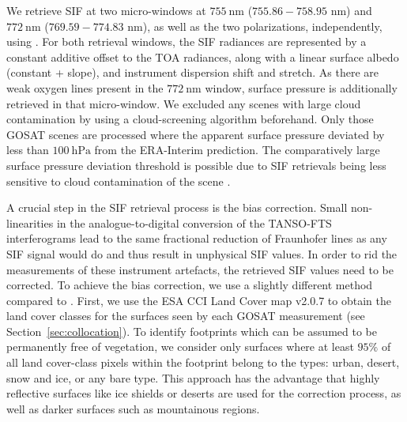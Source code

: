 \documentclass[preprint, a4paper, 10pt, times]{elsarticle}
\begin{document}
We retrieve SIF at two micro-windows at $755\:\mathrm{nm}$ ($755.86 - 758.95$ nm) and $772\:\mathrm{nm}$ ($769.59 - 774.83$ nm), as well as the two polarizations, independently, using \citet{Frankenberg2011}. For both retrieval windows, the SIF radiances are represented by a constant additive offset to the TOA radiances, along with a linear surface albedo (constant + slope), and instrument dispersion shift and stretch. As there are weak oxygen lines present in the $772\:\mathrm{nm}$ window, surface pressure is additionally retrieved in that micro-window. We excluded any scenes with large cloud contamination by using a cloud-screening algorithm beforehand. Only those GOSAT scenes are processed where the apparent surface pressure deviated by less than $100\:\mathrm{hPa}$ from the ERA-Interim prediction. The comparatively large surface pressure deviation threshold is possible due to SIF retrievals being less sensitive to cloud contamination of the scene \citep{frankenberg2012remote}.

A crucial step in the SIF retrieval process is the bias correction. Small non-linearities in the analogue-to-digital conversion of the TANSO-FTS interferograms lead to the same fractional reduction of Fraunhofer lines as any SIF signal would do and thus result in unphysical SIF values. In order to rid the measurements of these instrument artefacts, the retrieved SIF values need to be corrected. To achieve the bias correction, we use a slightly different method compared to \citet{Frankenberg2011}. First, we use the ESA CCI Land Cover map v2.0.7 \citep{Bontemps2013} to obtain the land cover classes for the surfaces seen by each GOSAT measurement (see Section~\ref{sec:collocation}). To identify footprints which can be assumed to be permanently free of vegetation, we consider only surfaces where at least $95\%$ of all land cover-class pixels within the footprint belong to the types: urban, desert, snow and ice, or any bare type. This approach has the advantage that highly reflective surfaces like ice shields or deserts are used for the correction process, as well as darker surfaces such as mountainous regions.
\end{document}

